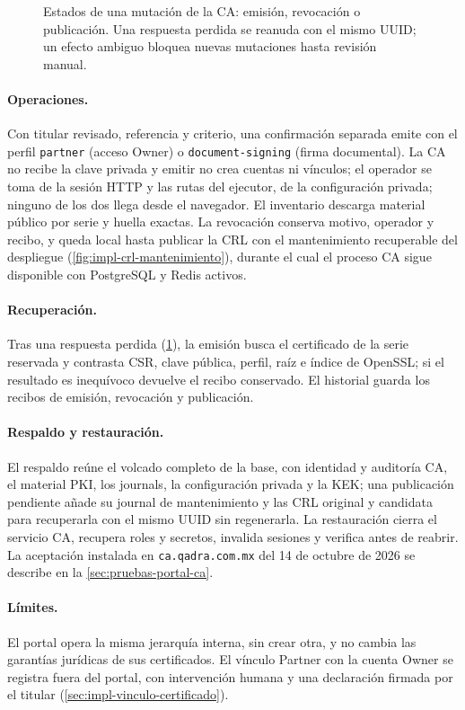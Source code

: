 \begin{figure}[!htbp]
  \centering
  
  \caption{Estados de una mutación de la CA: emisión, revocación o publicación.
    Una respuesta perdida se reanuda con el mismo UUID; un efecto ambiguo bloquea
    nuevas mutaciones hasta revisión manual.}
  \label{fig:impl-ca-estados}
\end{figure}

\paragraph{Operaciones.} Con titular revisado, referencia y
criterio, una confirmación separada emite con el perfil \texttt{partner}
(acceso Owner) o \texttt{document-signing} (firma documental). La CA no recibe
la clave privada y emitir no crea cuentas ni vínculos; el operador se toma de
la sesión HTTP y las rutas del ejecutor, de la configuración privada; ninguno de
los dos llega desde el navegador. El inventario descarga material público por serie y huella exactas.
La revocación conserva motivo, operador y recibo, y queda local hasta publicar
la CRL con el mantenimiento recuperable del despliegue
(\cref{fig:impl-crl-mantenimiento}), durante el cual el proceso CA sigue
disponible con PostgreSQL y Redis activos.

\paragraph{Recuperación.} Tras una respuesta perdida
(\cref{fig:impl-ca-estados}), la emisión busca el certificado de la serie
reservada y contrasta CSR, clave pública, perfil, raíz e índice de OpenSSL; si
el resultado es inequívoco devuelve el recibo conservado. El historial guarda
los recibos de emisión, revocación y publicación.

\paragraph{Respaldo y restauración.} El respaldo reúne el volcado completo de
la base, con identidad y auditoría CA, el material PKI, los journals, la
configuración privada y la KEK; una publicación pendiente añade su journal de
mantenimiento y las CRL original y candidata para recuperarla con el mismo UUID
sin regenerarla. La restauración cierra el servicio CA, recupera roles y
secretos, invalida sesiones y verifica antes de reabrir. La aceptación instalada
en \texttt{ca.qadra.com.mx} del 14 de octubre de 2026 se describe en la
\cref{sec:pruebas-portal-ca}.

\paragraph{Límites.} El portal opera la misma jerarquía interna, sin crear
otra, y no cambia las garantías jurídicas de sus certificados. El vínculo
Partner con la cuenta Owner se registra fuera del portal, con intervención
humana y una declaración firmada por el titular
(\cref{sec:impl-vinculo-certificado}).

